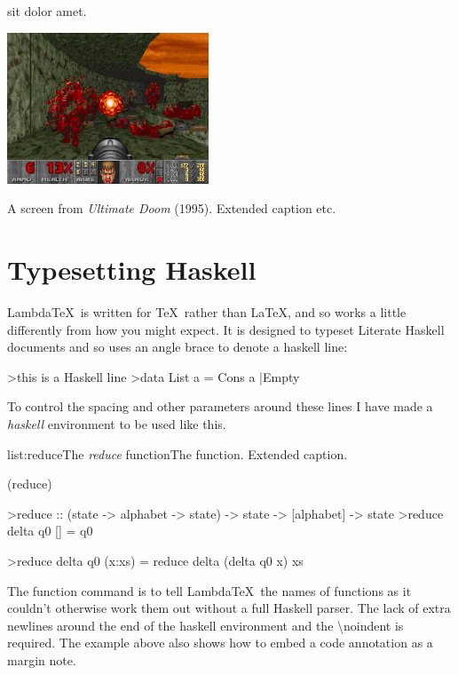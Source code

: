 
 sit dolor amet.
\lipsum[2-3]

\begin{marginfigure}
	\includegraphics[width=6cm]{res/game_screens/doom/doom.png}
	\caption[A screen from \emph{Ultimate Doom}.]{A screen from \emph{Ultimate Doom} (1995). Extended caption etc.}
	\label{fig:doom}
\end{marginfigure}

\lipsum[4]

\section{Typesetting Haskell}

Lambda\TeX\ is written for \TeX\ rather than \LaTeX, and so works a little differently from how you might expect. It is designed to typeset Literate Haskell documents and so uses an angle brace to denote a haskell line:

>this is a Haskell line
>data List a = Cons a |Empty

To control the spacing and other parameters around these lines I have made a \emph{haskell} environment to be used like this.

\vspace{-0.5em}
\begin{listing}{list:reduce}{The \emph{reduce} function}{The  function. Extended caption.}{}
\end{listing}\vspace{-1.5em}

\functions(reduce)
\begin{haskell}
>reduce :: (state -> alphabet -> state) -> state -> [alphabet] -> state
>reduce delta q0 []     = q0

\vspace{-1.7em}
>reduce delta q0 (x:xs) = reduce delta (delta q0 x) xs

\end{haskell}
\noindent
The function command is to tell Lambda\TeX\ the names of functions as it couldn't otherwise work them out without a full Haskell parser. The lack of extra newlines around the end of the haskell environment and the \textbackslash noindent is required. The example above also shows how to embed a code annotation as a margin note. 


